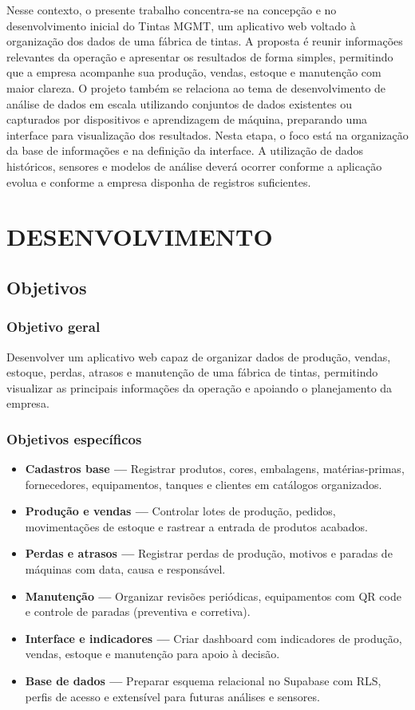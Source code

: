 \documentclass[12pt,a4paper]{article}
\begin{document}
Nesse contexto, o presente trabalho concentra-se na concepção e no desenvolvimento inicial do Tintas MGMT, um aplicativo web voltado à organização dos dados de uma fábrica de tintas. A proposta é reunir informações relevantes da operação e apresentar os resultados de forma simples, permitindo que a empresa acompanhe sua produção, vendas, estoque e manutenção com maior clareza.
O projeto também se relaciona ao tema de desenvolvimento de análise de dados em escala utilizando conjuntos de dados existentes ou capturados por dispositivos e aprendizagem de máquina, preparando uma interface para visualização dos resultados. Nesta etapa, o foco está na organização da base de informações e na definição da interface. A utilização de dados históricos, sensores e modelos de análise deverá ocorrer conforme a aplicação evolua e conforme a empresa disponha de registros suficientes.

\newpage
\section{DESENVOLVIMENTO}

\subsection{Objetivos}
\subsubsection*{Objetivo geral}
Desenvolver um aplicativo web capaz de organizar dados de produção, vendas, estoque, perdas, atrasos e manutenção de uma fábrica de tintas, permitindo visualizar as principais informações da operação e apoiando o planejamento da empresa.

\subsubsection*{Objetivos específicos}
\begin{itemize}
\item \textbf{Cadastros base —} Registrar produtos, cores, embalagens, matérias-primas, fornecedores, equipamentos, tanques e clientes em catálogos organizados.
\item \textbf{Produção e vendas —} Controlar lotes de produção, pedidos, movimentações de estoque e rastrear a entrada de produtos acabados.
\item \textbf{Perdas e atrasos —} Registrar perdas de produção, motivos e paradas de máquinas com data, causa e responsável.
\item \textbf{Manutenção —} Organizar revisões periódicas, equipamentos com QR code e controle de paradas (preventiva e corretiva).
\item \textbf{Interface e indicadores —} Criar dashboard com indicadores de produção, vendas, estoque e manutenção para apoio à decisão.
\item \textbf{Base de dados —} Preparar esquema relacional no Supabase com RLS, perfis de acesso e extensível para futuras análises e sensores.
\end{itemize}
\end{document}
